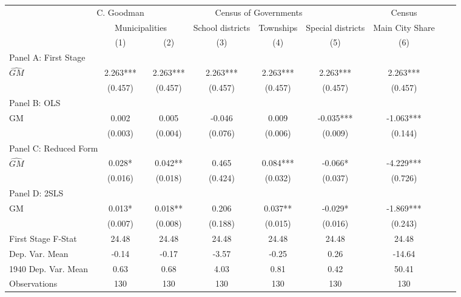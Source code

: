  \begin{tabular}{l*{8}{c}} \toprule
&\multicolumn{1}{c}{C. Goodman}&\multicolumn{4}{c}{Census of Governments}&\multicolumn{1}{c}{Census}\\\cmidrule(lr){2-2}\cmidrule(lr){3-6}\cmidrule(lr){7-7}
&\multicolumn{2}{c}{Municipalities}&\multicolumn{1}{c}{School districts}&\multicolumn{1}{c}{Townships}&\multicolumn{1}{c}{Special districts}&\multicolumn{1}{c}{Main City Share}\\\cmidrule(lr){2-3}\cmidrule(lr){4-6}\cmidrule(lr){7-7}
&\multicolumn{1}{c}{(1)}&\multicolumn{1}{c}{(2)}&\multicolumn{1}{c}{(3)}&\multicolumn{1}{c}{(4)}&\multicolumn{1}{c}{(5)}&\multicolumn{1}{c}{(6)}\\
\cmidrule(lr){1-7}
\multicolumn{6}{l}{Panel A: First Stage}\\
\cmidrule(lr){1-7}
$\widehat{GM}$  &    2.263***&    2.263***&    2.263***&    2.263***&    2.263***&    2.263***\\
                &  (0.457)   &  (0.457)   &  (0.457)   &  (0.457)   &  (0.457)   &  (0.457)   \\
\cmidrule(lr){1-7}
\multicolumn{6}{l}{Panel B: OLS}\\
\cmidrule(lr){1-7}
GM              &    0.002   &    0.005   &   -0.046   &    0.009   &   -0.035***&   -1.063***\\
                &  (0.003)   &  (0.004)   &  (0.076)   &  (0.006)   &  (0.009)   &  (0.144)   \\
\cmidrule(lr){1-7}
\multicolumn{6}{l}{Panel C: Reduced Form}\\
\cmidrule(lr){1-7}
$\widehat{GM}$  &    0.028*  &    0.042** &    0.465   &    0.084***&   -0.066*  &   -4.229***\\
                &  (0.016)   &  (0.018)   &  (0.424)   &  (0.032)   &  (0.037)   &  (0.726)   \\
\cmidrule(lr){1-7}
\multicolumn{6}{l}{Panel D: 2SLS}\\
\cmidrule(lr){1-7}
GM              &    0.013*  &    0.018** &    0.206   &    0.037** &   -0.029*  &   -1.869***\\
                &  (0.007)   &  (0.008)   &  (0.188)   &  (0.015)   &  (0.016)   &  (0.243)   \\
\midrule
First Stage F-Stat&    24.48   &    24.48   &    24.48   &    24.48   &    24.48   &    24.48   \\
Dep. Var. Mean  &    -0.14   &    -0.17   &    -3.57   &    -0.25   &     0.26   &   -14.64   \\
1940 Dep. Var. Mean&     0.63   &     0.68   &     4.03   &     0.81   &     0.42   &    50.41   \\
Observations    &      130   &      130   &      130   &      130   &      130   &      130   \\
       \bottomrule \end{tabular}
